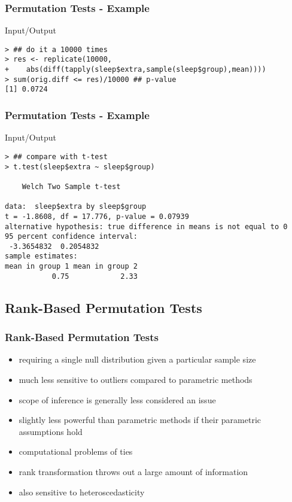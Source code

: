 \documentclass[xcolor={table},handout]{beamer}
\begin{document}
\begin{frame}[fragile]\frametitle{Permutation Tests - Example}
\begin{exampleblock}{Input/Output}\small
\begin{verbatim}
> ## do it a 10000 times
> res <- replicate(10000, 
+    abs(diff(tapply(sleep$extra,sample(sleep$group),mean))))
> sum(orig.diff <= res)/10000 ## p-value
[1] 0.0724
\end{verbatim}
\end{exampleblock}
\end{frame}


\begin{frame}[fragile]\frametitle{Permutation Tests - Example}
\begin{exampleblock}{Input/Output}\small
\begin{verbatim}
> ## compare with t-test
> t.test(sleep$extra ~ sleep$group)

	Welch Two Sample t-test

data:  sleep$extra by sleep$group
t = -1.8608, df = 17.776, p-value = 0.07939
alternative hypothesis: true difference in means is not equal to 0
95 percent confidence interval:
 -3.3654832  0.2054832
sample estimates:
mean in group 1 mean in group 2 
           0.75            2.33 
\end{verbatim}
\end{exampleblock}
\end{frame}

\subsection{Rank-Based Permutation Tests}
\begin{frame}\frametitle{Rank-Based Permutation Tests}
\begin{itemize}
\item requiring a single null distribution given a particular sample size
\item much less sensitive to outliers compared to parametric methods
\item scope of inference is generally less considered an issue
\item slightly less powerful than parametric methods if their parametric assumptions hold
\item computational problems of ties
\item rank transformation throws out a large amount of information
\item also sensitive to heteroscedasticity
\end{itemize}
\end{frame}
\end{document}
